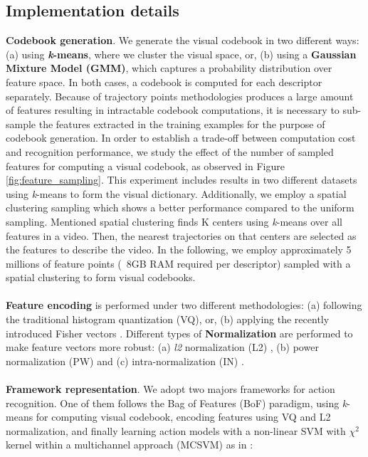 \documentclass[runningheads]{llncs}
\begin{document}
\subsection{Implementation details}

\textbf{Codebook generation}. We generate the visual codebook in two different ways: (a) using \textbf{\textit{k}-means}, where we cluster the visual space, or, (b) using a \textbf{Gaussian Mixture Model (GMM)}, which captures a probability distribution over feature space. In both cases, a codebook is computed for each descriptor separately. Because of trajectory points methodologies produces a large amount of features resulting in intractable codebook computations, it is necessary to sub-sample the features extracted in the training examples for the purpose of codebook generation. In order to establish a trade-off between computation cost and recognition performance, we study the effect of the number of sampled features for computing a visual codebook, as observed in Figure \ref{fig:feature_sampling}. This experiment includes results in two different datasets using \textit{k}-means to form the visual dictionary. Additionally, we employ a spatial clustering sampling which shows a better performance compared to the uniform sampling. Mentioned spatial clustering finds K centers using \textit{k}-means over all features in a video. Then, the nearest trajectories on that centers are selected as the features to describe the video. In the following, we employ approximately 5 millions of feature points (~8GB RAM required per descriptor) sampled with a spatial clustering to form visual codebooks.\\\\
\textbf{Feature encoding} is performed under two different methodologies: (a) following the traditional histogram quantization (VQ), or, (b) applying the recently introduced Fisher vectors \cite{perronnin2010}. Different types of \textbf{Normalization} are performed to make feature vectors more robust: (a) \textit{l2} normalization (L2) \cite{perronnin2010}, (b) power normalization (PW) \cite{perronnin2010} and (c) intra-normalization (IN) \cite{xwang2013}. \\\\
\textbf{Framework representation}. We adopt two majors frameworks for action recognition. One of them follows the Bag of Features (BoF) paradigm, using \textit{k}-means for computing visual codebook, encoding features using VQ and L2 normalization, and finally learning action models with a non-linear SVM with $\chi^2$ kernel within a multichannel approach (MCSVM) as in \cite{zhang2007}:
\end{document}
